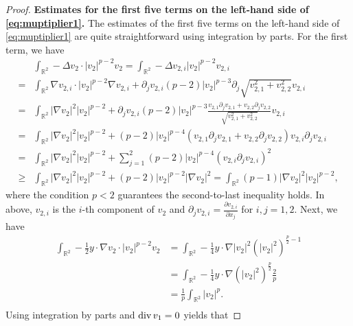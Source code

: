 \documentclass[12pt]{amsart}
\renewcommand{\div}{{\rm div \thinspace }}
\numberwithin{equation}{section}              %
\theoremstyle{remark}
\begin{document}
\begin{proof}
            \textbf{Estimates for the first five terms on the left-hand side of \eqref{eq:muptiplier1}.}
            The estimates of the first five terms on the left-hand side of \eqref{eq:muptiplier1} are quite straightforward using integration by parts.
			For the first term, we have 
			\begin{equation*}
				\begin{aligned}
					&\int_{\mathbb{R}^2}	-\Delta v_2  \cdot |v_2|^{p-2}v_2 = \int_{\mathbb{R}^2}	-\Delta v_{2,i}   |v_2|^{p-2}v_{2,i}\\
					= &\int_{\mathbb{R}^2}	\nabla v_{2,i}  \cdot |v_2|^{p-2}\nabla v_{2,i} + \partial_j v_{2,i} (p-2) |v_2|^{p-3} \partial_j \sqrt{v_{2,1}^2+v_{2,2}^2}v_{2,i}\\
					=&\int_{\mathbb{R}^2} |\nabla v_2|^2 |v_2|^{p-2} + \partial_j v_{2,i} (p-2) |v_2|^{p-3} \frac{v_{2,1}\partial_j  v_{2,1} + v_{2,2}\partial_j  v_{2,2}  }{\sqrt{v_{2,1}^2+v_{2,2}^2}}v_{2,i}\\
					=&\int_{\mathbb{R}^2} |\nabla v_2|^2 |v_2|^{p-2} +   (p-2) |v_2|^{p-4} (v_{2,1}\partial_j  v_{2,1} + v_{2,2}\partial_j  v_{2,2}  ) v_{2,i}  \partial_j v_{2,i}\\
					=&\int_{\mathbb{R}^2} |\nabla v_2|^2 |v_2|^{p-2} +  \sum_{j=1}^{2}(p-2)|v_2|^{p-4}  (v_{2,i}  \partial_j v_{2,i})^2\\
					\geq & \int_{\mathbb{R}^2} |\nabla v_2|^2 |v_2|^{p-2} + (p-2) |v_2|^{p-2} |\nabla v_2|^2= \int_{\mathbb{R}^2} (p-1) |\nabla v_2|^2 |v_2|^{p-2},
				\end{aligned}
			\end{equation*}
			where  the condition $p<2$ guarantees  the second-to-last inequality holds.
			In above, $v_{2,i}$ is the $i$-th component of $v_2$ and $ \partial_j v_{2,i} = \frac{\partial  v_{2,i}}{\partial x_j}$ for $i,j=1,2$. Next, we have 
			\begin{equation*}\label{eq:est11}
				\begin{aligned}
					\int_{\mathbb{R}^2}	 -\frac{1}{2}y\cdot \nabla v_2\cdot |v_2|^{p-2}v_2
					&=\int_{\mathbb{R}^2}-\frac{1}{4}y\cdot \nabla |v_2|^2 (|v_2|^{2})^{\frac{p}{2}-1}\\
					&=\int_{\mathbb{R}^2}-\frac{1}{4}y\cdot \nabla  (|v_2|^{2})^{\frac{p}{2}}\frac{2}{p}\\
					&=\frac{1}{p} \int_{\mathbb{R}^2}  |v_2|^{p}.\\
				\end{aligned}
			\end{equation*}
		Using integration by parts and $\div v_1=0$ yields that

\end{proof}
\end{document}
